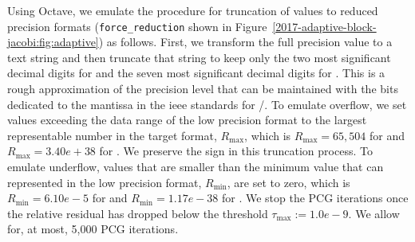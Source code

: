 Using Octave, we emulate the procedure for truncation of \fpd values to reduced 
precision
formats ({\tt \small force\_reduction} shown in Figure~\ref{2017-adaptive-block-jacobi:fig:adaptive})
as follows. First, we transform the full precision value to a text
string and then truncate that string to keep only the two most significant 
decimal digits for \fph and the seven most significant decimal digits for \fps.
This is a rough approximation of the precision level that can be maintained 
with the bits dedicated to the mantissa in the {\sc ieee} standards for 
\fph/\fps. 
To emulate overflow, we set values
exceeding the data range of the low precision format to the largest
representable number in the target format, $R_{\max}$, which is 
$R_{\max}=65,504$ for \fph 
and $R_{\max}=3.40e+38$ for \fps. We preserve the sign in this truncation
process. To emulate underflow, values  that are smaller than the
minimum value that can represented in the low precision format, $R_{\min}$, 
are set to zero, which is $R_{\min}=6.10e-5$ for \fph and $R_{\min}=1.17e-38$ 
for \fps.
We stop the PCG iterations once the relative residual has dropped below the
threshold $\tau_{\max}:=1.0e-9$. We allow for, at most, 5,000 PCG iterations.

